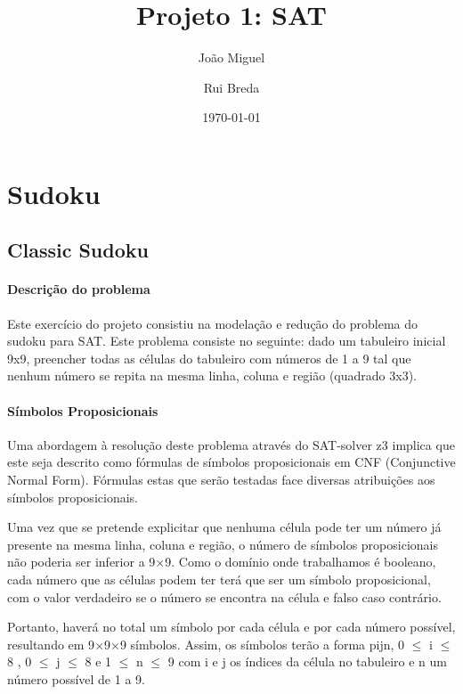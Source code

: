 \documentclass[a4paper,12pt]{article}
\begin{document}
\title{Projeto 1: SAT}
\author{João Miguel \and Rui Breda}
\date{\today}
\maketitle
\section{Sudoku}
\subsection{Classic Sudoku}
\paragraph{Descrição do problema \newline}
Este exercício do projeto consistiu na modelação e redução do problema do sudoku para SAT. Este problema consiste no seguinte: dado um tabuleiro inicial 9x9, preencher todas as células do tabuleiro com números de 1 a 9 tal que nenhum número se repita na mesma linha, coluna e região (quadrado 3x3).
\paragraph{Símbolos Proposicionais \newline}
Uma abordagem à resolução deste problema através do SAT-solver z3 implica que este seja descrito como fórmulas de símbolos proposicionais em CNF (Conjunctive Normal Form). Fórmulas estas que serão testadas face diversas atribuições aos símbolos proposicionais.\newline

Uma vez que se pretende explicitar que nenhuma célula pode ter um número já presente na mesma linha, coluna e região, o número de símbolos proposicionais não poderia ser inferior a 9$\times$9. Como o domínio onde trabalhamos é booleano, cada número que as células podem ter terá que ser um símbolo proposicional, com o valor verdadeiro se o número se encontra na célula e falso caso contrário.\newline
 
Portanto, haverá no total um símbolo por cada célula e por cada número possível, resultando em 9$\times$9$\times$9 símbolos. Assim, os símbolos terão a forma p\textunderscore i\textunderscore j\textunderscore n, 0 $\leq$ i $\leq$ 8 , 0 $\leq$ j $\leq$ 8 e 1 $\leq$ n $\leq$ 9 com i e j os índices da célula no tabuleiro e n um número possível de 1 a 9.
\end{document}
